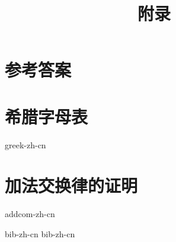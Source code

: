 \documentclass[b5paper]{ctexart}
\begin{document}
\title{附录}

\maketitle
\fi

\chapter{参考答案}
\label{ch:answers}
\shipoutAnswer

\chapter{希腊字母表} \label{ch:greek-letters}
{greek-zh-cn}

\chapter{加法交换律的证明}
{addcom-zh-cn}

\markboth{\bibname}{}

\begin{thebibliography}{99}
  {bib-zh-cn}
  {bib-zh-cn}
\end{thebibliography}

\ifx\wholebook\relax \else
\expandafter\enddocument
\fi
\end{document}
